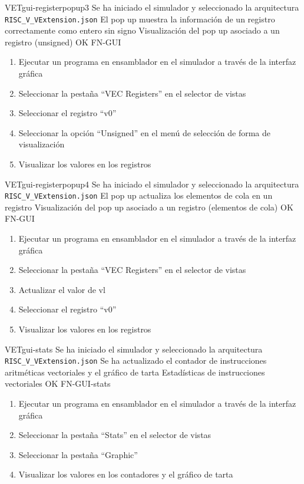 \begin{testCase}{VET}{gui-registerpopup3}
    {Se ha iniciado el simulador y seleccionado la arquitectura \texttt{RISC\_V\_VExtension.json}}
    {El pop up muestra la información de un registro correctamente como entero sin signo}
    {Visualización del pop up asociado a un registro (unsigned)} %
    {OK} %
    {FN-GUI}
    \begin{enumerate}
        \item Ejecutar un programa en ensamblador en el simulador a través de la interfaz gráfica
        \item Seleccionar la pestaña ``VEC Registers'' en el selector de vistas
        \item Seleccionar el registro ``v0''
        \item Seleccionar la opción ``Unsigned'' en el menú de selección de forma de visualización
        \item Visualizar los valores en los registros
    \end{enumerate}
\end{testCase}

\begin{testCase}{VET}{gui-registerpopup4}
    {Se ha iniciado el simulador y seleccionado la arquitectura \texttt{RISC\_V\_VExtension.json}}
    {El pop up actualiza los elementos de cola en un registro}
    {Visualización del pop up asociado a un registro (elementos de cola)} %
    {OK} %
    {FN-GUI}
    \begin{enumerate}
        \item Ejecutar un programa en ensamblador en el simulador a través de la interfaz gráfica
        \item Seleccionar la pestaña ``VEC Registers'' en el selector de vistas
        \item Actualizar el valor de vl
        \item Seleccionar el registro ``v0''
        \item Visualizar los valores en los registros
    \end{enumerate}
\end{testCase}

\begin{testCase}{VET}{gui-stats}
    {Se ha iniciado el simulador y seleccionado la arquitectura \texttt{RISC\_V\_VExtension.json}}
    {Se ha actualizado el contador de instrucciones aritméticas vectoriales y el gráfico de tarta}
    {Estadísticas de instrucciones vectoriales} %
    {OK} %
    {FN-GUI-stats}
    \begin{enumerate}
        \item Ejecutar un programa en ensamblador en el simulador a través de la interfaz gráfica
        \item Seleccionar la pestaña ``Stats'' en el selector de vistas
        \item Seleccionar la pestaña ``Graphic''
        \item Visualizar los valores en los contadores y el gráfico de tarta
    \end{enumerate}
\end{testCase}

